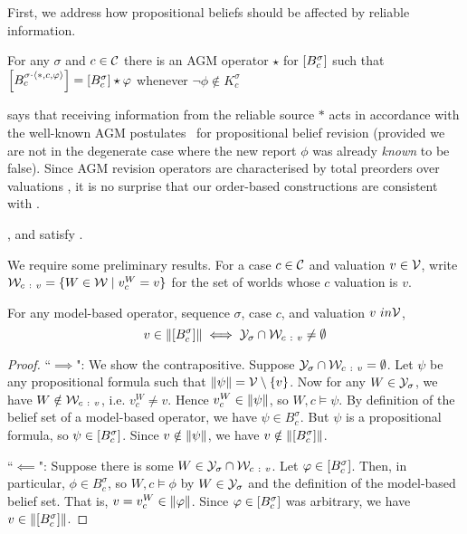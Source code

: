 First, we address how propositional beliefs should be affected by reliable
information.

\begin{postulate}[\agm{}]
    For any $\sigma$ and $c \in \mathcal{C}$ there is an AGM operator $\star$
    for $\left[{B^\sigma_c}\right]$ such that $\left[{B^{\sigma \cdot
    \langle {\ast, c, \varphi} \rangle}_c}\right] = \left[{B^\sigma_c}\right] \star \varphi$ whenever
    $\neg\phi \notin K^\sigma_c$
\end{postulate}

\agm{} says that receiving information from the reliable source $\ast$ acts in
accordance with the well-known AGM postulates~\cite{alchourron1985logic} for propositional belief
revision (provided we are not in the degenerate case where the new report
$\phi$ was already \emph{known} to be false). Since AGM revision operators are
characterised by total preorders over valuations
\cite{grove1988two,katsuno_1991}, it is no surprise that our order-based
constructions are consistent with \agm{}.


\begin{proposition}
    \label{kr_prop_examples_satisfy_agm}
    \varbasedcond{}, \partbasedcond{} and \scorebasedop{}
    satisfy \agm{}.
\end{proposition}

We require some preliminary results. For a case $c \in \mathcal{C}$ and valuation $v \in
\mathcal{V}$, write $\mathcal{W}_{c\ :\ v} = \{W \in \mathcal{W} \mid v^W_c = v\}$ for the set of
worlds whose $c$ valuation is $v$.

\begin{lemma}
    \label{kr_lemma_model_based_models_of_proppart}
    For any model-based operator, sequence $\sigma$, case $c$, and valuation
    $v\ in \mathcal{V}$,
    \[
        v \in \|{\left[{B^\sigma_c}\right]}\|
        \iff
        \mathcal{Y}_\sigma \cap \mathcal{W}_{c\ :\  v} \ne \emptyset
    \]
\end{lemma}

\begin{proof}
    ``$\implies$": We show the contrapositive. Suppose $\mathcal{Y}_\sigma \cap \mathcal{W}_{c\
    :\ v} = \emptyset$. Let $\psi$ be any propositional formula such that
    $\|{\psi}\| = \mathcal{V} \setminus \{v\}$. Now for any $W \in \mathcal{Y}_\sigma$,
    we have $W \notin \mathcal{W}_{c\ :\  v}$, i.e. $v^W_c \ne v$. Hence $v^W_c \in
    \|{\psi}\|$, so $W, c \models \psi$. By definition of the belief set
    of a model-based operator, we have $\psi \in B^\sigma_c$. But $\psi$ is a
    propositional formula, so $\psi \in \left[{B^\sigma_c}\right]$. Since $v \notin
    \|{\psi}\|$, we have $v \notin \|{\left[{B^\sigma_c}\right]}\|$.

    ``$\impliedby$": Suppose there is some $W \in \mathcal{Y}_\sigma \cap \mathcal{W}_{c\ :\
    v}$. Let $\varphi \in \left[{B^\sigma_c}\right]$. Then, in particular, $\phi \in
    B^\sigma_c$, so $W, c \models \phi$ by $W \in \mathcal{Y}_\sigma$ and the definition
    of the model-based belief set. That is, $v = v^W_c \in \|{\varphi}\|$.
    Since $\varphi \in \left[{B^\sigma_c}\right]$ was arbitrary, we have $v \in
    \|{\left[{B^\sigma_c}\right]}\|$.

\end{proof}


